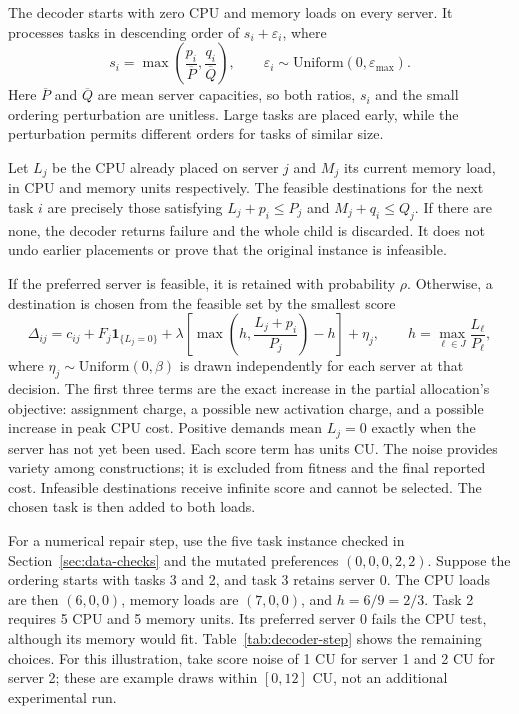 \documentclass[10pt,a4paper]{article}
\begin{document}
The decoder starts with zero CPU and memory loads on every server. It processes
tasks in descending order of $s_i+\varepsilon_i$, where
\[
s_i=\max\left(\frac{p_i}{\overline P},\frac{q_i}{\overline Q}\right),
\qquad \varepsilon_i\sim\mathrm{Uniform}(0,\varepsilon_{\max}).
\]
Here $\overline P$ and $\overline Q$ are mean server capacities, so both ratios,
$s_i$ and the small ordering perturbation are unitless. Large tasks are placed
early, while the perturbation permits different orders for tasks of similar size.

Let $L_j$ be the CPU already placed on server $j$ and $M_j$ its current memory
load, in CPU and memory units respectively. The feasible destinations for the
next task $i$ are precisely those satisfying
$L_j+p_i\leq P_j$ and $M_j+q_i\leq Q_j$. If there are none, the decoder returns
failure and the whole child is discarded. It does not undo earlier placements
or prove that the original instance is infeasible.

If the preferred server is feasible, it is retained with probability $\rho$.
Otherwise, a destination is chosen from the feasible set by the smallest score
\[
\Delta_{ij}=c_{ij}+F_j\mathbf{1}_{\{L_j=0\}}
 +\lambda\left[\max\left(h,\frac{L_j+p_i}{P_j}\right)-h\right]+\eta_j,
\qquad
h=\max_{\ell\in J}\frac{L_\ell}{P_\ell},
\]
where $\eta_j\sim\mathrm{Uniform}(0,\beta)$ is drawn independently for each
server at that decision. The first three terms are the exact increase in the
partial allocation's objective: assignment charge, a possible new activation
charge, and a possible increase in peak CPU cost. Positive demands mean
$L_j=0$ exactly when the server has not yet been used. Each score term has
units CU. The noise provides variety among constructions; it is excluded from
fitness and the final reported cost. Infeasible destinations receive infinite
score and cannot be selected. The chosen task is then added to both loads.

For a numerical repair step, use the five task instance checked in
Section~\ref{sec:data-checks} and the mutated preferences $(0,0,0,2,2)$. Suppose the ordering
starts with tasks 3 and 2, and task 3 retains server 0. The CPU loads are
then $(6,0,0)$, memory loads are $(7,0,0)$, and $h=6/9=2/3$.
Task 2 requires 5 CPU and 5 memory units. Its preferred server 0 fails the
CPU test, although its memory would fit. Table~\ref{tab:decoder-step}
shows the remaining choices. For this illustration, take score noise of
1 CU for server 1 and 2 CU for server 2; these are example draws within
$[0,12]$ CU, not an additional experimental run.
\end{document}
